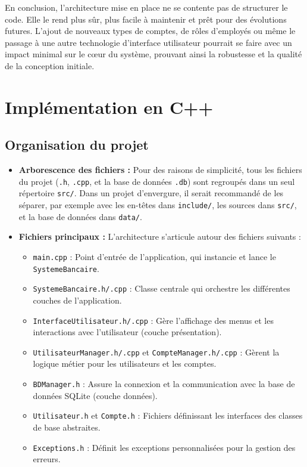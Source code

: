En conclusion, l'architecture mise en place ne se contente pas de structurer le code. Elle le rend plus sûr, plus facile à maintenir et prêt pour des évolutions futures. L'ajout de nouveaux types de comptes, de rôles d'employés ou même le passage à une autre technologie d'interface utilisateur pourrait se faire avec un impact minimal sur le cœur du système, prouvant ainsi la robustesse et la qualité de la conception initiale.

\chapter{Implémentation en C++}
\section{Organisation du projet}
\begin{itemize}[leftmargin=*]
  \item \textbf{Arborescence des fichiers :} Pour des raisons de simplicité, tous les fichiers du projet (\texttt{.h}, \texttt{.cpp}, et la base de données \texttt{.db}) sont regroupés dans un seul répertoire \texttt{src/}. Dans un projet d'envergure, il serait recommandé de les séparer, par exemple avec les en-têtes dans \texttt{include/}, les sources dans \texttt{src/}, et la base de données dans \texttt{data/}.
  \item \textbf{Fichiers principaux :} L'architecture s'articule autour des fichiers suivants :
    \begin{itemize}
        \item \texttt{main.cpp} : Point d'entrée de l'application, qui instancie et lance le \texttt{SystemeBancaire}.
        \item \texttt{SystemeBancaire.h/.cpp} : Classe centrale qui orchestre les différentes couches de l'application.
        \item \texttt{InterfaceUtilisateur.h/.cpp} : Gère l'affichage des menus et les interactions avec l'utilisateur (couche présentation).
        \item \texttt{UtilisateurManager.h/.cpp} et \texttt{CompteManager.h/.cpp} : Gèrent la logique métier pour les utilisateurs et les comptes.
        \item \texttt{BDManager.h} : Assure la connexion et la communication avec la base de données SQLite (couche données).
        \item \texttt{Utilisateur.h} et \texttt{Compte.h} : Fichiers définissant les interfaces des classes de base abstraites.
        \item \texttt{Exceptions.h} : Définit les exceptions personnalisées pour la gestion des erreurs.
    \end{itemize}
\end{itemize}

